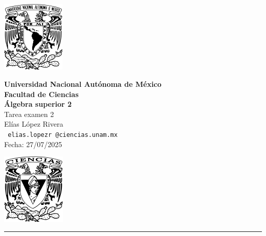 \documentclass[11pt,letterpaper]{article}
\begin{document}

\begin{center}
    \begin{minipage}{3cm}
    	\begin{center}
    		\includegraphics[height=3.4cm]{logo_unam.png}
    	\end{center}
    \end{minipage}\hfill
    \begin{minipage}{10cm}
    	\begin{center}
    	\textbf{\large Universidad Nacional Autónoma de México}\\[0.1cm]
        \textbf{Facultad de Ciencias}\\[0.1cm]
        \textbf{\'Algebra superior 2}\\[0.1cm]
        Tarea examen 2 \\[0.1cm]
         El\'ias L\'opez Rivera\\[0.1cm]
        \texttt{ elias.lopezr\,@ciencias.unam.mx }\\[0.1cm]
        Fecha:\,\,27/07/2025
    	\end{center}
    \end{minipage}\hfill
    \begin{minipage}{3cm}
    	\begin{center}
    		\includegraphics[height=3.4cm]{Logo_FC.png}
    	\end{center}
    \end{minipage}
\end{center}

\rule{17cm}{0.1mm}
\end{document}
